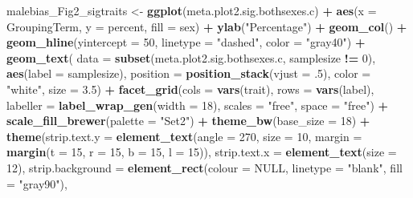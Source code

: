 \documentclass[]{article}
\newenvironment{Shaded}{\begin{snugshade}}{\end{snugshade}}
\newcommand{\DataTypeTok}[1]{\textcolor[rgb]{0.13,0.29,0.53}{#1}}
\newcommand{\DecValTok}[1]{\textcolor[rgb]{0.00,0.00,0.81}{#1}}
\newcommand{\FloatTok}[1]{\textcolor[rgb]{0.00,0.00,0.81}{#1}}
\newcommand{\KeywordTok}[1]{\textcolor[rgb]{0.13,0.29,0.53}{\textbf{#1}}}
\newcommand{\NormalTok}[1]{#1}
\newcommand{\OperatorTok}[1]{\textcolor[rgb]{0.81,0.36,0.00}{\textbf{#1}}}
\newcommand{\OtherTok}[1]{\textcolor[rgb]{0.56,0.35,0.01}{#1}}
\newcommand{\StringTok}[1]{\textcolor[rgb]{0.31,0.60,0.02}{#1}}
\begin{document}
\begin{Shaded}
\begin{Highlighting}[]
{{{{{{{{{{{{\NormalTok{malebias_Fig2_sigtraits <-}
\StringTok{  }\KeywordTok{ggplot}\NormalTok{(meta.plot2.sig.bothsexes.c) }\OperatorTok{+}
\StringTok{  }\KeywordTok{aes}\NormalTok{(}\DataTypeTok{x =}\NormalTok{ GroupingTerm, }\DataTypeTok{y =}\NormalTok{ percent, }\DataTypeTok{fill =}\NormalTok{ sex) }\OperatorTok{+}
\StringTok{  }\KeywordTok{ylab}\NormalTok{(}\StringTok{"Percentage"}\NormalTok{) }\OperatorTok{+}
\StringTok{  }\KeywordTok{geom_col}\NormalTok{() }\OperatorTok{+}
\StringTok{  }\KeywordTok{geom_hline}\NormalTok{(}\DataTypeTok{yintercept =} \DecValTok{50}\NormalTok{, }\DataTypeTok{linetype =} \StringTok{"dashed"}\NormalTok{, }\DataTypeTok{color =} \StringTok{"gray40"}\NormalTok{) }\OperatorTok{+}
\StringTok{  }\KeywordTok{geom_text}\NormalTok{(}
    \DataTypeTok{data =} \KeywordTok{subset}\NormalTok{(meta.plot2.sig.bothsexes.c, samplesize }\OperatorTok{!=}\StringTok{ }\DecValTok{0}\NormalTok{), }\KeywordTok{aes}\NormalTok{(}\DataTypeTok{label =}\NormalTok{ samplesize), }\DataTypeTok{position =} \KeywordTok{position_stack}\NormalTok{(}\DataTypeTok{vjust =} \FloatTok{.5}\NormalTok{),}
    \DataTypeTok{color =} \StringTok{"white"}\NormalTok{, }\DataTypeTok{size =} \FloatTok{3.5}\NormalTok{) }\OperatorTok{+}
\StringTok{  }\KeywordTok{facet_grid}\NormalTok{(}\DataTypeTok{cols =} \KeywordTok{vars}\NormalTok{(trait), }
             \DataTypeTok{rows =} \KeywordTok{vars}\NormalTok{(label), }
             \DataTypeTok{labeller =} \KeywordTok{label_wrap_gen}\NormalTok{(}\DataTypeTok{width =} \DecValTok{18}\NormalTok{),}
             \DataTypeTok{scales =} \StringTok{"free"}\NormalTok{, }\DataTypeTok{space =} \StringTok{"free"}\NormalTok{) }\OperatorTok{+}
\StringTok{  }\KeywordTok{scale_fill_brewer}\NormalTok{(}\DataTypeTok{palette =} \StringTok{"Set2"}\NormalTok{) }\OperatorTok{+}
\StringTok{  }\KeywordTok{theme_bw}\NormalTok{(}\DataTypeTok{base_size =} \DecValTok{18}\NormalTok{) }\OperatorTok{+}
\StringTok{  }\KeywordTok{theme}\NormalTok{(}\DataTypeTok{strip.text.y =} \KeywordTok{element_text}\NormalTok{(}\DataTypeTok{angle =} \DecValTok{270}\NormalTok{, }\DataTypeTok{size =} \DecValTok{10}\NormalTok{, }\DataTypeTok{margin =} \KeywordTok{margin}\NormalTok{(}\DataTypeTok{t =} \DecValTok{15}\NormalTok{, }\DataTypeTok{r =} \DecValTok{15}\NormalTok{, }\DataTypeTok{b =} \DecValTok{15}\NormalTok{, }\DataTypeTok{l =} \DecValTok{15}\NormalTok{)),}
        \DataTypeTok{strip.text.x =} \KeywordTok{element_text}\NormalTok{(}\DataTypeTok{size =} \DecValTok{12}\NormalTok{),}
        \DataTypeTok{strip.background =} \KeywordTok{element_rect}\NormalTok{(}\DataTypeTok{colour =} \OtherTok{NULL}\NormalTok{, }\DataTypeTok{linetype =} \StringTok{"blank"}\NormalTok{, }\DataTypeTok{fill =} \StringTok{"gray90"}\NormalTok{),}
}}}}}}}}}}}}
\end{Highlighting}
\end{Shaded}
\end{document}
